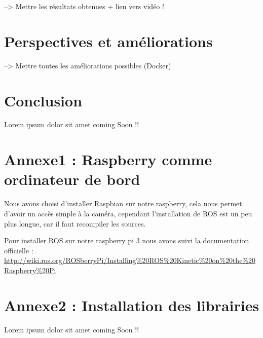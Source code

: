 \documentclass[12pt, openany]{report}
\begin{document}
--> Mettre les résultats obtenues + lien vers vidéo !

\section{Perspectives et améliorations}
--> Mettre toutes les améliorations possibles (Docker)

\section*{Conclusion}
Lorem ipsum dolor sit amet
coming Soon !!

\section*{Annexe1 : Raspberry comme ordinateur de bord}

Nous avons choisi d'installer Raspbian sur notre raspberry, cela nous permet d'avoir un accès simple à la caméra, cependant l'installation de ROS est un peu plus longue, car il faut recompiler les sources.

Pour installer ROS sur notre raspberry pi 3 nous avons suivi la documentation officielle :  \url{http://wiki.ros.org/ROSberryPi/Installing%20ROS%20Kinetic%20on%20the%20Raspberry%20Pi}



\section*{Annexe2 : Installation des librairies}
Lorem ipsum dolor sit amet
coming Soon !!
\end{document}
